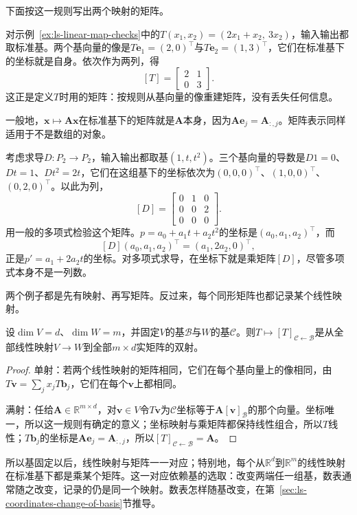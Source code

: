 下面按这一规则写出两个映射的矩阵。
\begin{example}[由基向量的像写出矩阵]
\label{ex:ls-plane-operator-matrix}
对示例~\ref{ex:ls-linear-map-checks}中的$T(x_1,x_2)=(2x_1+x_2,\ 3x_2)$，输入输出都取标准基。两个基向量的像是$T\bm e_1=(2,0)^{\top}$与$T\bm e_2=(1,3)^{\top}$，它们在标准基下的坐标就是自身。依次作为两列，得
\[
 [T]=\begin{bmatrix}2&1\\0&3\end{bmatrix}.
\]
这正是定义$T$时用的矩阵：按规则从基向量的像重建矩阵，没有丢失任何信息。
\end{example}
一般地，$\bm x\mapsto\bm A\bm x$在标准基下的矩阵就是$\bm A$本身，因为$\bm A\bm e_j=\bm A_{:,j}$。矩阵表示同样适用于不是数组的对象。
\begin{example}[求导的矩阵表示]
\label{ex:ls-derivative-matrix}
考虑求导$D:P_2\to P_2$，输入输出都取基$(1,t,t^2)$。三个基向量的导数是$D1=0$、$Dt=1$、$Dt^2=2t$，它们在这组基下的坐标依次为$(0,0,0)^\top$、$(1,0,0)^\top$、$(0,2,0)^\top$。以此为列，
\[
 [D]=\begin{bmatrix}0&1&0\\0&0&2\\0&0&0\end{bmatrix}.
\]
用一般的多项式检验这个矩阵。$p=a_0+a_1t+a_2t^2$的坐标是$(a_0,a_1,a_2)^\top$，而
\[
 [D](a_0,a_1,a_2)^\top=(a_1,2a_2,0)^\top,
\]
正是$p'=a_1+2a_2t$的坐标。对多项式求导，在坐标下就是乘矩阵$[D]$，尽管多项式本身不是一列数。
\end{example}

两个例子都是先有映射、再写矩阵。反过来，每个同形矩阵也都记录某个线性映射。
\begin{theorem}[线性映射与矩阵的对应]
\label{thm:ls-map-matrix-correspondence}
设$\dim V=d$、$\dim W=m$，并固定$V$的基$\mathcal B$与$W$的基$\mathcal C$。则$T\mapsto[T]_{\mathcal C\leftarrow\mathcal B}$是从全部线性映射$V\to W$到全部$m\times d$实矩阵的双射。
\end{theorem}
\begin{proof}
单射：若两个线性映射的矩阵相同，它们在每个基向量上的像相同，由$T\bm v=\sum_jx_jT\bm b_j$，它们在每个$\bm v$上都相同。

满射：任给$\bm A\in\mathbb R^{m\times d}$，对$\bm v\in V$令$T\bm v$为$\mathcal C$坐标等于$\bm A[\bm v]_{\mathcal B}$的那个向量。坐标唯一，所以这一规则有确定的意义；坐标映射与乘矩阵都保持线性组合，所以$T$线性；$T\bm b_j$的坐标是$\bm A\bm e_j=\bm A_{:,j}$，所以$[T]_{\mathcal C\leftarrow\mathcal B}=\bm A$。
\end{proof}
所以基固定以后，线性映射与矩阵一一对应；特别地，每个从$\mathbb R^d$到$\mathbb R^m$的线性映射在标准基下都是乘某个矩阵。这一对应依赖基的选取：改变两端任一组基，数表通常随之改变，记录的仍是同一个映射。数表怎样随基改变，在第~\ref{sec:ls-coordinates-change-of-basis}节推导。

